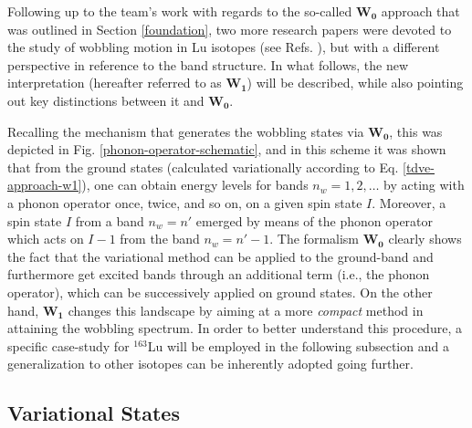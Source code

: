 Following up to the team's work with regards to the so-called $\mathbf{W_0}$ approach that was outlined in Section \ref{foundation}, two more research papers were devoted to the study of wobbling motion in Lu isotopes (see Refs. \cite{raduta2020approach,raduta2020towards}), but with a different perspective in reference to the band structure. In what follows, the new interpretation (hereafter referred to as $\mathbf{W_1}$) will be described, while also pointing out key distinctions between it and $\mathbf{W_0}$.

Recalling the mechanism that generates the wobbling states via $\mathbf{W_0}$, this was depicted in Fig. \ref{phonon-operator-schematic}, and in this scheme it was shown that from the ground states (calculated variationally according to Eq. \ref{tdve-approach-w1}), one can obtain energy levels for bands $n_w=1, 2, \dots$ by acting with a phonon operator once, twice, and so on, on a given spin state $I$. Moreover, a spin state $I$ from a band $n_w=n'$ emerged by means of the phonon operator which acts on $I-1$ from the band $n_w=n'-1$. The formalism $\mathbf{W_0}$ clearly shows the fact that the variational method can be applied to the ground-band and furthermore get excited bands through an additional term (i.e., the phonon operator), which can be successively applied on ground states. On the other hand, $\mathbf{W_1}$ changes this landscape by aiming at a more \emph{compact} method in attaining the wobbling spectrum. In order to better understand this procedure, a specific case-study for $^{163}$Lu will be employed in the following subsection and a generalization to other isotopes can be inherently adopted going further.

\subsection{Variational States}

